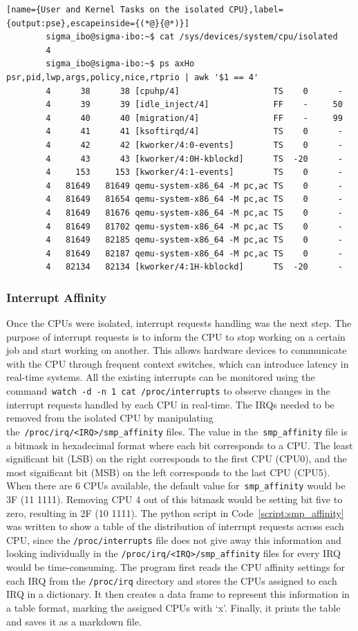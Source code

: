 \documentclass[MMR,Master,english]{twbook}
\begin{document}
\vspace{2em}
\begin{lstlisting}[name={User and Kernel Tasks on the isolated CPU},label={output:pse},escapeinside={(*@}{@*)}]
		sigma_ibo@sigma-ibo:~$ cat /sys/devices/system/cpu/isolated
		4
		sigma_ibo@sigma-ibo:~$ ps axHo psr,pid,lwp,args,policy,nice,rtprio | awk '$1 == 4'
		4      38      38 [cpuhp/4]                   TS    0      -
		4      39      39 [idle_inject/4]             FF    -     50
		4      40      40 [migration/4]               FF    -     99
		4      41      41 [ksoftirqd/4]               TS    0      -
		4      42      42 [kworker/4:0-events]        TS    0      -
		4      43      43 [kworker/4:0H-kblockd]      TS  -20      -
		4     153     153 [kworker/4:1-events]        TS    0      -
		4   81649   81649 qemu-system-x86_64 -M pc,ac TS    0      -
		4   81649   81654 qemu-system-x86_64 -M pc,ac TS    0      -
		4   81649   81676 qemu-system-x86_64 -M pc,ac TS    0      -
		4   81649   81702 qemu-system-x86_64 -M pc,ac TS    0      -
		4   81649   82185 qemu-system-x86_64 -M pc,ac TS    0      -
		4   81649   82187 qemu-system-x86_64 -M pc,ac TS    0      -
		4   82134   82134 [kworker/4:1H-kblockd]      TS  -20      -
\end{lstlisting}

\subsubsection{Interrupt Affinity}\label{subsubsec:irq_handling}
Once the CPUs were isolated, interrupt requests handling was the next step. The purpose of interrupt requests is to inform the CPU to stop working on a certain job and start working on another. This allows hardware devices to communicate with the CPU through frequent context switches, which can introduce latency in real-time systems. All the existing interrupts can be monitored using the command~\texttt{watch -d -n 1 cat /proc/interrupts} to observe changes in the interrupt requests handled by each CPU in real-time. The IRQs needed to be removed from the isolated CPU by manipulating the~\texttt{/proc/irq/<IRQ>/smp\_affinity} files. The value in the~\texttt{smp\_affinity} file is a bitmask in hexadecimal format where each bit corresponds to a CPU. The least significant bit (LSB) on the right corresponds to the first CPU (CPU0), and the most significant bit (MSB) on the left corresponds to the last CPU (CPU5). When there are 6 CPUs available, the default value for~\texttt{smp\_affinity} would be 3F (11 1111). Removing CPU 4 out of this bitmask would be setting bit five to zero, resulting in 2F (10 1111). The python script in Code~\ref{script:smp_affinity} was written to show a table of the distribution of interrupt requests across each CPU, since the \texttt{/proc/interrupts} file does not give away this information and looking individually in the \texttt{/proc/irq/<IRQ>/smp\_affinity} files for every IRQ would be time-consuming. The program first reads the CPU affinity settings for each IRQ from the \texttt{/proc/irq} directory and stores the CPUs assigned to each IRQ in a dictionary. It then creates a data frame to represent this information in a table format, marking the assigned CPUs with ‘x’. Finally, it prints the table and saves it as a markdown file.
\end{document}
